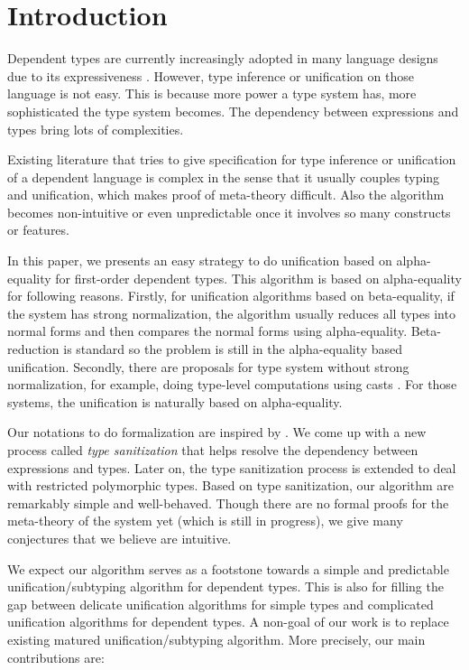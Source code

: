 \section{Introduction}

Dependent types are currently increasingly adopted in many language
designs due to its expressiveness \cite{xi1999dependent, licata2005formulation,
  pasalic2006concoqtion, mckinna2006dependent,
  norell2009dependently, brady2013idris}.
However, type inference or unification on those language is not easy.
This is because
more power a type system has, more sophisticated the type system
becomes. The dependency between expressions and types bring lots of complexities.

Existing literature \cite{ziliani2015unification, abel2011higher, elliott1989higher}
that tries to give specification for type inference
or unification of
a dependent language is complex in the sense that it usually couples typing
and unification, which makes proof of meta-theory difficult.
Also the algorithm becomes non-intuitive or even unpredictable once it involves
so many constructs or features.

In this paper, we presents an easy strategy to do unification based on
alpha-equality for first-order dependent
types. This algorithm is based on alpha-equality for following reasons. Firstly,
for unification algorithms based on beta-equality, if the system has strong
normalization, the algorithm usually reduces all types into normal forms and
then compares the normal forms using
alpha-equality. Beta-reduction is standard so the problem is still in the
alpha-equality based unification.
Secondly, there are proposals for type system without strong
normalization, for example, doing type-level computations using casts
\cite{van2013explicit, kimmell2012equational, sjoberg2012irrelevance}
. For
those systems, the unification is naturally based on alpha-equality.

Our notations to do formalization are inspired by \cite{dunfield2013complete}.
We come up with a new
process called \textit{type sanitization} that helps resolve the dependency
between expressions and types. Later on, the type sanitization process is
extended to deal with restricted polymorphic types.
Based on type sanitization, our algorithm
are remarkably simple and well-behaved.
Though there are no formal proofs for the meta-theory of the system yet
(which is still in progress),
we give many conjectures that we believe are intuitive.

We expect our algorithm serves as a footstone towards
a simple and predictable unification/subtyping algorithm for
dependent types. This is also for
filling the gap between
delicate unification algorithms for simple types
and
complicated unification algorithms for dependent types.
A non-goal of our work
is to replace existing matured unification/subtyping algorithm.
More precisely, our main contributions are:

